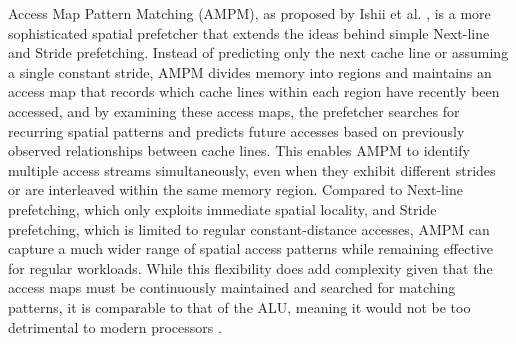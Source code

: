 \documentclass[12pt, letterpaper]{article}
\begin{document}
\noindent Access Map Pattern Matching (AMPM), as proposed by Ishii et al. \cite{ishii-jilp-11}, is a more sophisticated spatial prefetcher that extends the ideas behind simple Next-line and Stride prefetching. Instead of predicting only the next cache line or assuming a single constant stride, AMPM divides memory into regions and maintains an access map that records which cache lines within each region have recently been accessed, and by examining these access maps, the prefetcher searches for recurring spatial patterns and predicts future accesses based on previously observed relationships between cache lines. This enables AMPM to identify multiple access streams simultaneously, even when they exhibit different strides or are interleaved within the same memory region. Compared to Next-line prefetching, which only exploits immediate spatial locality, and Stride prefetching, which is limited to regular constant-distance accesses, AMPM can capture a much wider range of spatial access patterns while remaining effective for regular workloads. While this flexibility does add complexity given that the access maps must be continuously maintained and searched for matching patterns, it is comparable to that of the ALU, meaning it would not be too detrimental to modern processors \cite{ishii-jilp-11}. 
\end{document}
